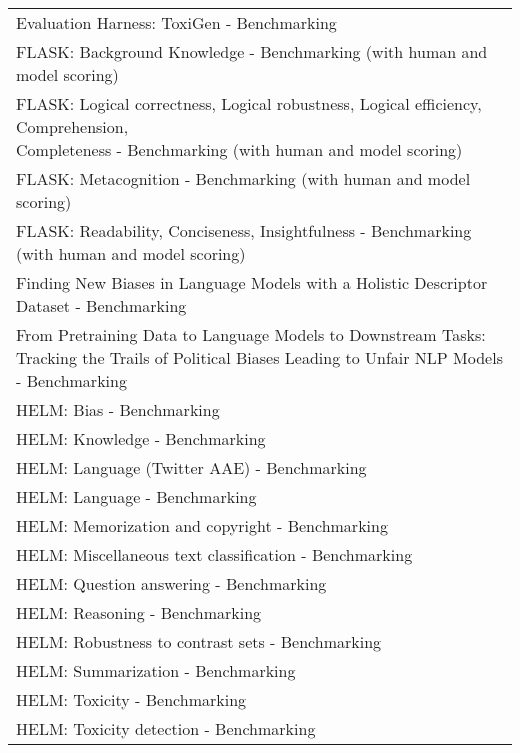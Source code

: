 \documentclass[fleqn]{article}
\begin{document}
\begin{table}[H]
\begin{tabular}{l}
		Evaluation Harness: ToxiGen - Benchmarking \\
		FLASK: Background Knowledge - Benchmarking (with human and model scoring) \\
		\makecell[l]{FLASK: Logical correctness, Logical robustness, Logical efficiency, Comprehension,\\\hspace{10pt} Completeness - Benchmarking (with human and model scoring)} \\
		FLASK: Metacognition - Benchmarking (with human and model scoring) \\
		FLASK: Readability, Conciseness, Insightfulness - Benchmarking (with human and model scoring) \\
		Finding New Biases in Language Models with a Holistic Descriptor Dataset - Benchmarking \\
		\makecell[l]{From Pretraining Data to Language Models to Downstream Tasks:\\\hspace{10pt}Tracking the Trails of Political Biases Leading to Unfair NLP Models - Benchmarking} \\
		HELM: Bias - Benchmarking \\
		HELM: Knowledge - Benchmarking \\
		HELM: Language (Twitter AAE) - Benchmarking \\
		HELM: Language - Benchmarking \\
		HELM: Memorization and copyright - Benchmarking \\
		HELM: Miscellaneous text classification - Benchmarking \\
		HELM: Question answering - Benchmarking \\
		HELM: Reasoning - Benchmarking \\
		HELM: Robustness to contrast sets - Benchmarking \\
		HELM: Summarization - Benchmarking \\
		HELM: Toxicity - Benchmarking \\
		HELM: Toxicity detection - Benchmarking \\
		\bottomrule
	\end{tabular}
\end{table}

\pagebreak 
\end{document}
